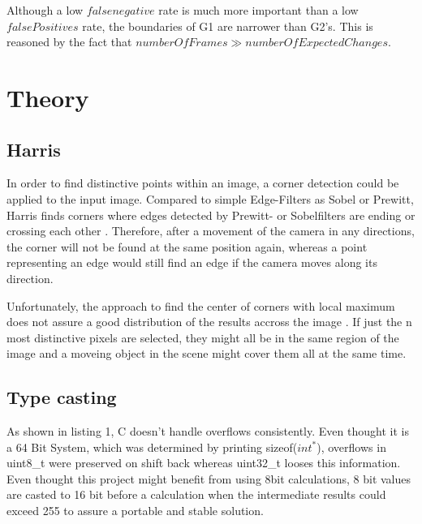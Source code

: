 Although a low $\mathit{false negative}$ rate is much more important than a low $\mathit{falsePositives}$ rate, the boundaries of G1 are narrower than G2's. This is reasoned by the fact that $\mathit{numberOfFrames} \gg \mathit{numberOfExpectedChanges}.$

\chapter{Theory}
 \section{ Harris}
 \label{sec:harris}
In order to find distinctive points within an image, a corner detection could be applied to the input image. Compared to simple Edge-Filters as Sobel or Prewitt, Harris finds corners where edges detected by Prewitt- or Sobelfilters are ending or crossing each other \cite{edge-detection}. Therefore, after a movement of the camera in any directions, the corner will not be found at the same position again, whereas a point representing an edge would still find an edge if the camera moves along its direction.  \newline

Unfortunately, the approach to find the center of corners with local maximum does not assure a good distribution of the results accross the image \cite{harris-detector}. If just the n most distinctive pixels are selected, they might all be in the same region of the image and a moveing object in the scene might cover them all at the same time.

\section{Type casting}
As shown in listing 1, C doesn't handle overflows consistently. Even thought it is a 64 Bit System, which was determined by printing sizeof($int^*$), overflows in uint8\_t were preserved on shift back whereas uint32\_t looses this information. Even thought this project might benefit from using 8bit calculations, 8 bit values are casted to 16 bit before a calculation when the intermediate results could exceed 255 to assure a portable and stable solution.

